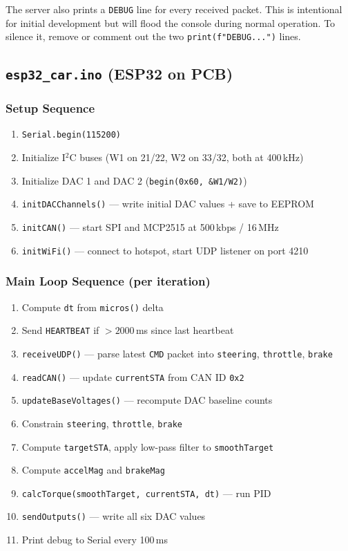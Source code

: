 \documentclass[12pt, letterpaper]{article}
\begin{document}
The server also prints a \texttt{DEBUG} line for every received packet.
This is intentional for initial development but will flood the console during
normal operation.  To silence it, remove or comment out the two
\texttt{print(f"DEBUG...")} lines.

\subsection{\texttt{esp32\_car.ino} (ESP32 on PCB)}

\subsubsection*{Setup Sequence}

\begin{enumerate}
  \item \texttt{Serial.begin(115200)}
  \item Initialize I$^2$C buses (W1 on 21/22, W2 on 33/32, both at 400\,kHz)
  \item Initialize DAC 1 and DAC 2 (\texttt{begin(0x60, \&W1/W2)})
  \item \texttt{initDACChannels()} --- write initial DAC values + save to EEPROM
  \item \texttt{initCAN()} --- start SPI and MCP2515 at 500\,kbps / 16\,MHz
  \item \texttt{initWiFi()} --- connect to hotspot, start UDP listener on port 4210
\end{enumerate}

\subsubsection*{Main Loop Sequence (per iteration)}

\begin{enumerate}
  \item Compute \texttt{dt} from \texttt{micros()} delta
  \item Send \texttt{HEARTBEAT} if $>2000$\,ms since last heartbeat
  \item \texttt{receiveUDP()} --- parse latest \texttt{CMD} packet into
        \texttt{steering}, \texttt{throttle}, \texttt{brake}
  \item \texttt{readCAN()} --- update \texttt{currentSTA} from CAN ID \texttt{0x2}
  \item \texttt{updateBaseVoltages()} --- recompute DAC baseline counts
  \item Constrain \texttt{steering}, \texttt{throttle}, \texttt{brake}
  \item Compute \texttt{targetSTA}, apply low-pass filter to \texttt{smoothTarget}
  \item Compute \texttt{accelMag} and \texttt{brakeMag}
  \item \texttt{calcTorque(smoothTarget, currentSTA, dt)} --- run PID
  \item \texttt{sendOutputs()} --- write all six DAC values
  \item Print debug to Serial every 100\,ms
\end{enumerate}
\end{document}
